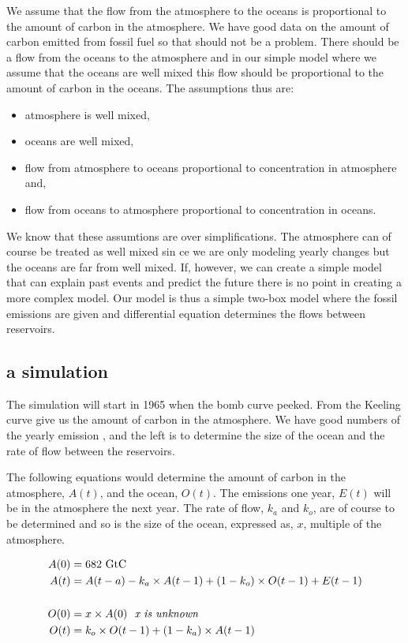 \documentclass[a4paper,11pt]{article}
\begin{document}
We assume that the flow from the atmosphere to the oceans is
proportional to the amount of carbon in the atmosphere. We have good
data on the amount of carbon emitted from fossil fuel so that should
not be a problem. There should be a flow from the oceans to the
atmosphere and in our simple model where we assume that the oceans
are well mixed this flow should be proportional to the amount of
carbon in the oceans. The assumptions thus are:
\begin{itemize}
\item atmosphere is well mixed,
\item oceans are well mixed,
\item flow from atmosphere to oceans proportional to concentration in atmosphere and,
\item flow from oceans to atmosphere  proportional to concentration in oceans.
\end{itemize}

We know that these assumtions are over simplifications. The atmosphere
can of course be treated as well mixed sin ce we are only modeling
yearly changes but the oceans are far from well mixed. If, however, we
can create a simple model that can explain past events and predict the
future there is no point in creating a more complex model. Our model
is thus a simple two-box model where the fossil emissions are given
and differential equation determines the flows between reservoirs. 

\subsection*{a simulation}

The simulation will start in 1965 when the bomb curve peeked. From the
Keeling curve \cite{noaa:co2} give us the amount of carbon in the
atmosphere. We have good numbers of the yearly emission \cite{gcb},
and the left is to determine the size of the ocean and the rate of flow
between the reservoirs.

The following equations would determine the amount of carbon in the
atmosphere, $A(t)$, and the ocean, $O(t)$. The emissions one year,
$E(t)$ will be in the atmosphere the next year. The rate of flow,
$k_a$ and $k_o$, are of course to be determined and so is the size of
the ocean, expressed as, $x$, multiple of the atmosphere. 

\begin{align*}
  A(0) &= 682 \ \text{GtC} \\
  A(t) &= A(t-a) - k_a \times A(t-1) + (1 - k_o) \times O(t-1) + E(t-1) \\
  \\
  O(0) &= x \times A(0) \ \ \text{\em x is unknown}\\
  O(t) &= k_o \times O(t-1) + (1 - k_a) \times A(t-1)\\
\end{align*}
\end{document}

